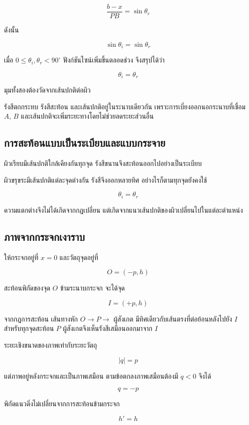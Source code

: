 \[
\frac{b-x}{PB}=\sin\theta_r
\]

ดังนั้น

\[
\sin\theta_i=\sin\theta_r
\]

เมื่อ $0\le\theta_i,\theta_r<90^\circ$ ฟังก์ชันไซน์เพิ่มขึ้นตลอดช่วง จึงสรุปได้ว่า

\begin{tcolorbox}[title={กฎการสะท้อน}]
\[
\boxed{\theta_i=\theta_r}
\]

มุมทั้งสองต้องวัดจากเส้นปกติต่อผิว
\end{tcolorbox}

รังสีตกกระทบ รังสีสะท้อน และเส้นปกติอยู่ในระนาบเดียวกัน เพราะการเบี่ยงออกนอกระนาบที่เชื่อม $A$, $B$ และเส้นปกติจะเพิ่มระยะทางโดยไม่ช่วยลดระยะส่วนอื่น

\subsection{การสะท้อนแบบเป็นระเบียบและแบบกระจาย}

ผิวเรียบมีเส้นปกติใกล้เคียงกันทุกจุด รังสีขนานจึงสะท้อนออกไปอย่างเป็นระเบียบ

ผิวขรุขระมีเส้นปกติแต่ละจุดต่างกัน รังสีจึงออกหลายทิศ อย่างไรก็ตามทุกจุดยังคงใช้

\[
\theta_i=\theta_r
\]

ความแตกต่างจึงไม่ได้เกิดจากกฎเปลี่ยน แต่เกิดจากแนวเส้นปกติของผิวเปลี่ยนไปในแต่ละตำแหน่ง

\subsection{ภาพจากกระจกเงาราบ}

ให้กระจกอยู่ที่ $x=0$ และวัตถุจุดอยู่ที่

\[
O=(-p,h)
\]

สะท้อนพิกัดของจุด $O$ ข้ามระนาบกระจก จะได้จุด

\[
I=(+p,h)
\]

จากกฎการสะท้อน เส้นทางหัก $O\to P\to$ ผู้สังเกต มีทิศเดียวกับเส้นตรงที่ต่อย้อนหลังไปยัง $I$ สำหรับทุกจุดสะท้อน $P$ ผู้สังเกตจึงเห็นรังสีเสมือนออกมาจาก $I$

ระยะเชิงขนาดของภาพเท่ากับระยะวัตถุ

\[
|q|=p
\]

แต่ภาพอยู่หลังกระจกและเป็นภาพเสมือน ตามข้อตกลงภาพเสมือนต้องมี $q<0$ จึงได้

\[
\boxed{q=-p}
\]

พิกัดแนวดิ่งไม่เปลี่ยนจากการสะท้อนข้ามกระจก

\[
h'=h
\]

